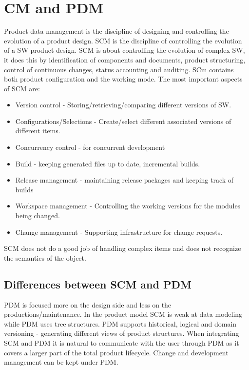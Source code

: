 \section{CM and PDM}
Product data management is the discipline of designing and controlling the evolution of a product design. SCM is the discipline of controlling the evolution of a SW product design.
SCM is about controlling the evolution of complex SW, it does this by identification of components and documents, product structuring, control of continuous changes, status accounting and auditing. SCm contains both product configuration and the working mode.
The most important aspects of SCM are:
\begin{itemize}
    \item Version control - Storing/retrieving/comparing different versions of SW.
    \item Configurations/Selections - Create/select different associated versions of different items.
    \item Concurrency control - for concurrent development
    \item Build - keeping generated files  up to date, incremental builds.
    \item Release management - maintaining release packages and keeping track of builds 
    \item Workspace management - Controlling the working versions for the modules being changed.
    \item Change management - Supporting infrastructure for change requests.
\end{itemize}
SCM does not do a good job of handling complex items and does not recognize the semantics of the object.
\subsection{Differences between SCM and PDM}
PDM is focused more on the design side and less on the productions/maintenance.
In the product model SCM  is weak at data modeling while PDM uses tree structures. PDM supports historical, logical and domain versioning - generating different views of product structures.
When integrating SCM and PDM it is natural to communicate with the user through PDM as it covers a larger part of the total product lifecycle. Change and development management can be kept under PDM.







